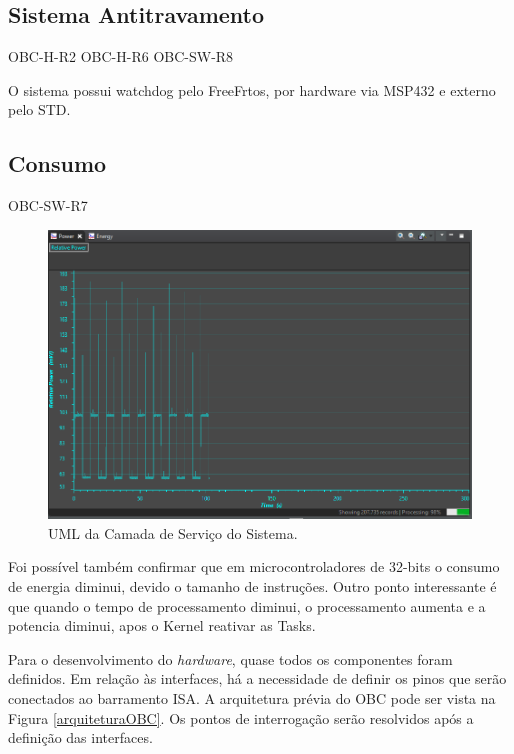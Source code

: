 \subsection{Sistema Antitravamento}
OBC-H-R2
OBC-H-R6
OBC-SW-R8

O sistema possui watchdog pelo FreeFrtos, por hardware via MSP432 e externo pelo STD.

\subsection{Consumo}
OBC-SW-R7

\begin{figure}[h]
	\centering
	\includegraphics[keepaspectratio=true,scale=0.72]{figuras/powerComsuption.PNG}
	\caption{UML da Camada de Serviço do Sistema.}
	\label{uml_CSS}
\end{figure}

Foi possível também confirmar que em microcontroladores de 32-bits o consumo de energia diminui, devido o tamanho de instruções. Outro ponto interessante é que quando o tempo de processamento diminui, o processamento aumenta e a potencia diminui, apos o Kernel reativar as Tasks.

Para o desenvolvimento do \textit{hardware}, quase todos os componentes foram definidos. Em relação às interfaces, há a necessidade de definir os pinos que serão conectados ao barramento ISA. A arquitetura prévia do OBC pode ser vista na Figura \ref{arquiteturaOBC}. Os pontos de interrogação serão resolvidos após a definição das interfaces.

